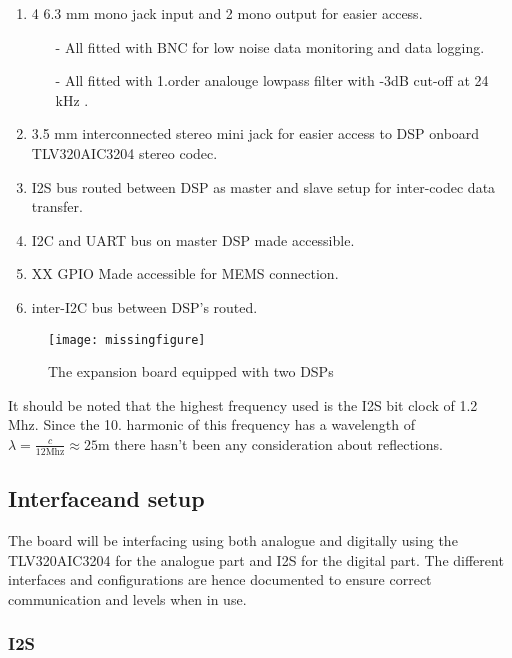 \begin{enumerate}
	\item 4 6.3 mm mono jack input and 2 mono output for easier access.
	\begin{itemize}
		\item[-] All fitted with BNC for low noise data monitoring and data logging.
		\item[-] All fitted with 1.order analouge lowpass filter with -3dB cut-off at 24 kHz .
	\end{itemize}
	\item 3.5 mm interconnected stereo mini jack for easier access to DSP onboard TLV320AIC3204 stereo codec.
	\item I2S bus routed between DSP as master and slave setup for inter-codec data transfer.
	\item I2C and UART bus on master DSP made accessible.
	\item XX GPIO Made accessible for MEMS connection.
	\item inter-I2C bus between DSP's routed. 
\end{enumerate}

\begin{figure}[H]
	\centering
	\texttt{[image: missingfigure]}	
	\caption{The expansion board equipped with two DSPs}
	\label{fig:PCBboard}
\end{figure}

It should be noted that the highest frequency used is the I2S bit clock of 1.2 Mhz. Since the 10. harmonic of this frequency has a wavelength of $\lambda=\frac{c}{12 \text{Mhz}}\approx25\text{m}$ there hasn't been any consideration about reflections.






\subsection{Interfaceand setup}\label{subsec:Interface}

The board will be interfacing using both analogue and digitally using the TLV320AIC3204 for the analogue part and I2S for the digital part. The different interfaces and configurations are hence documented to ensure correct communication and levels when in use. 

\subsubsection*{I2S}

